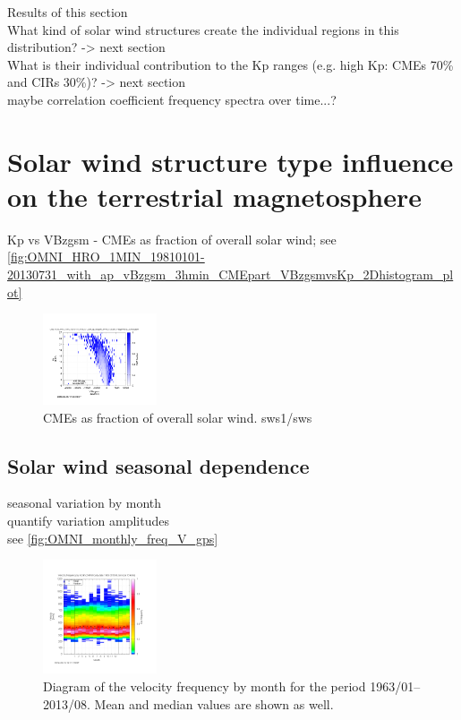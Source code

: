 Results of this section\\
What kind of solar wind structures create the individual regions in this distribution? -> next section\\
What is their individual contribution to the Kp ranges (e.g. high Kp: CMEs 70\% and CIRs 30\%)? -> next section\\

maybe correlation coefficient frequency spectra over time...?\\


\section{Solar wind structure type influence on the terrestrial magnetosphere}

Kp vs VBzgsm - CMEs as fraction of overall solar wind; see \autoref{fig:OMNI_HRO_1MIN_19810101-20130731_with_ap_vBzgsm_3hmin_CMEpart_VBzgsmvsKp_2Dhistogram_plot}
\begin{figure}[htb]
	\centering
	\includegraphics[width=0.3\textwidth]{images/gnuplots/OMNI_HRO_1MIN_19810101-20130731_with_ap_vBzgsm_3hmin_CMEpart_VBzgsmvsKp_2Dhistogram_plot.png}
	\caption{CMEs as fraction of overall solar wind. sws1/sws}
	\label{fig:OMNI_HRO_1MIN_19810101-20130731_with_ap_vBzgsm_3hmin_CMEpart_VBzgsmvsKp_2Dhistogram_plot}
\end{figure}

\subsection{Solar wind seasonal dependence}
seasonal variation by month\\
quantify variation amplitudes\\

see \autoref{fig:OMNI_monthly_freq_V_gps}
\begin{figure}[htb]
	\centering
	\includegraphics[width=0.3\textwidth]{images/gnuplots/OMNI_monthly_freq_V_gps.png}
	\caption{Diagram of the velocity frequency by month for the period 1963/01--2013/08. Mean and median values are shown as well.}
	\label{fig:OMNI_monthly_freq_V_gps}
\end{figure}

